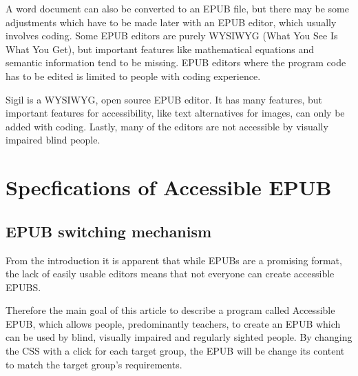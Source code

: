 \documentclass{llncs}
\begin{document}

A word document can also be converted to an EPUB file, but there may be some adjustments which have to be made later with an EPUB editor, which usually involves coding. 
Some EPUB editors are purely WYSIWYG (What You See Is What You Get), but important features like mathematical equations and semantic information tend to be missing. EPUB editors where the program code has to be edited is limited to people with coding experience.

Sigil is a WYSIWYG, open source EPUB editor.\cite{Sigil} It has many features, but important features for accessibility, like text alternatives for images, can only be added with coding.
Lastly, many of the editors are not accessible by visually impaired blind people. 


\section{Specfications of Accessible EPUB}

\subsection{EPUB switching mechanism}

From the introduction it is apparent that while EPUBs are a promising format, the lack of easily usable editors means that not everyone can create accessible EPUBS.

Therefore the main goal of this article to describe a program called Accessible EPUB, which allows people, predominantly teachers, to create an EPUB which can be used by blind, visually impaired and regularly sighted people. By changing the CSS with a click for each target group, the EPUB will be change its content to match the target group's requirements. 


\end{document}
